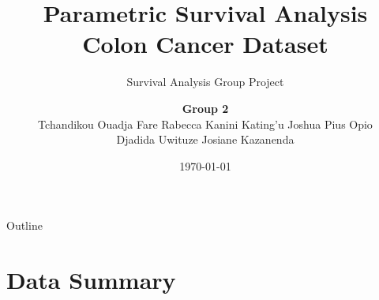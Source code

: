 \documentclass[aspectratio=169, 11pt]{beamer}
\title{\textbf{Parametric Survival Analysis}\\[4pt]
       \large Colon Cancer Dataset}
\subtitle{Survival Analysis Group Project}
\author{%
  \textbf{Group 2}\\[6pt]
  \small
  Tchandikou Ouadja Fare \quad
  Rabecca Kanini Kating'u \quad
  Joshua Pius Opio\\[2pt]
  Djadida Uwituze \quad
  Josiane Kazanenda
}
\date{\today}
\institute{African Institute for Mathematical Sciences}
\begin{document}

{
\begin{frame}[plain]
  \vspace{1.8cm}
  \titlepage
\end{frame}
}

\begin{frame}{Outline}
  \tableofcontents[hideallsubsections]
\end{frame}

\section{Data Summary}
\end{document}
